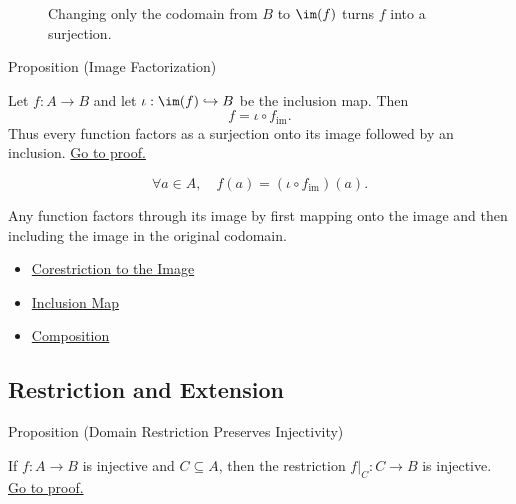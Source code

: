 \begin{figure}[htbp]
\centering

\caption{Changing only the codomain from $B$ to $\im(f)$ turns $f$ into a surjection.}
\label{fig:corestriction-to-image}
\end{figure}

\begin{propositionbox}{Proposition (Image Factorization)}
\begin{proposition}\label{prop:image-factorization}
Let $f:A\to B$ and let $\iota:\im(f)\hookrightarrow B$ be the inclusion map.
Then
\[
f=\iota\circ f_{\operatorname{im}}.
\]
Thus every function factors as a surjection onto its image followed by an
inclusion.
\hyperref[prf:image-factorization]{Go to proof.}
\end{proposition}
\end{propositionbox}

\begin{remark*}
\[
  \forall a\in A,\quad f(a)=(\iota\circ f_{\operatorname{im}})(a).
\]
\end{remark*}

\begin{remark*}[Interpretation]
Any function factors through its image by first mapping onto the image and then
including the image in the original codomain.
\end{remark*}

\begin{dependencies}
\begin{itemize}
  \item \hyperref[def:corestriction-to-image]{Corestriction to the Image}
  \item \hyperref[def:inclusion]{Inclusion Map}
  \item \hyperref[def:composition]{Composition}
\end{itemize}
\end{dependencies}

\subsection*{Restriction and Extension}

\begin{propositionbox}{Proposition (Domain Restriction Preserves Injectivity)}
\begin{proposition}\label{prop:restriction-preserves-injective}
If $f:A\to B$ is injective and $C\subseteq A$, then the restriction
$f|_C:C\to B$ is injective.
\hyperref[prf:restriction-preserves-injective]{Go to proof.}
\end{proposition}
\end{propositionbox}

